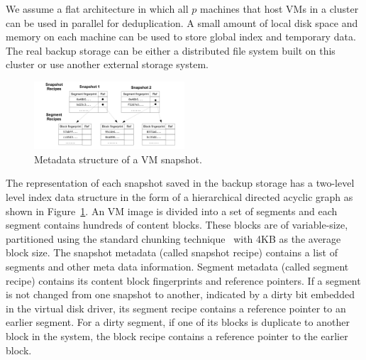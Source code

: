 We assume a flat architecture in which  all $p$ machines that host VMs in a cluster can 
be used in parallel for deduplication. 
A small amount of local disk space and memory on each machine can be used 
to store global index and temporary data. 
The real backup storage can be either a distributed file system built on
this cluster  or use another  external storage system. 



\begin{figure}
\centering
\includegraphics[width=0.5\textwidth]{snapshotdata.pdf}
\caption{ Metadata structure of a VM snapshot.}
\label{fig:snapshot}
\end{figure}

The representation of each snapshot saved in the backup storage
has a two-level level index data structure in the form of a hierarchical
directed acyclic graph as shown in Figure~\ref{fig:snapshot}.
An VM image is divided into a set of segments and each  segment contains hundreds of content blocks. 
These blocks are of variable-size, partitioned using
the standard chunking technique~\cite{similar94} with 4KB as the average block size. 
The snapshot metadata (called snapshot recipe) contains a list of segments and other meta data information.
Segment metadata (called segment recipe) contains its  content block fingerprints and reference pointers. 
If a segment is not changed from one snapshot to another, indicated by a dirty bit embedded in the virtual disk driver, 
its segment recipe contains a reference pointer to an earlier segment.
For a dirty segment, if one of its blocks is duplicate to another block in the system,  
the block recipe contains a reference pointer to the earlier block.





